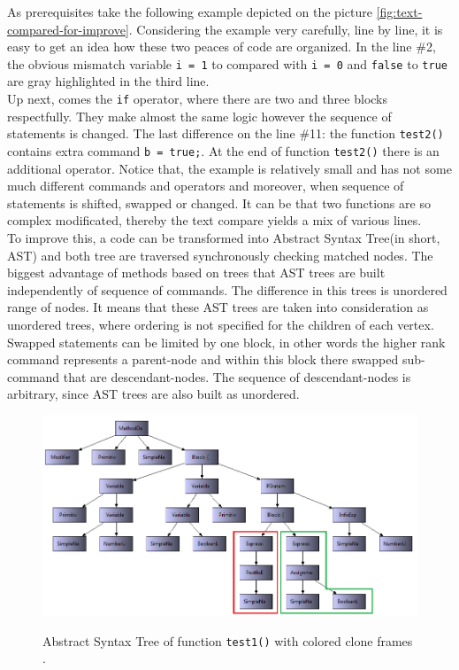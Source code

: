 \documentclass{report}
\begin{document}
As prerequisites take the following example depicted on the picture \ref{fig:text-compared-for-improve}. Considering the example very carefully, line by line, it is easy to get an idea how these two peaces of code are organized. In the line \#2, the obvious mismatch variable \texttt{i = 1} to compared with \texttt{i = 0} and \texttt{false} to \texttt{true} are gray highlighted in the third line.
\\
Up next, comes the \texttt{if} operator, where there are two and three blocks respectfully. They make almost the same logic however the sequence of statements is changed.
The last difference on the line \#11: the function \texttt{test2()} contains extra command \texttt{b = true;}.
At the end of function \texttt{test2()} there is an additional operator. Notice that, the example is relatively small and has not some much different commands and operators and moreover, when sequence of statements is shifted, swapped or changed. It can be that two functions are so complex modificated, thereby the text compare yields a mix of various lines. 
\\
To improve this, a code can be transformed into Abstract Syntax Tree(in short, AST) and both tree are traversed synchronously checking matched nodes. The biggest advantage of methods based on trees that AST trees are built independently of sequence of commands. The difference in this trees is unordered range of nodes. It means that these AST trees are taken into consideration as unordered trees, where ordering is not specified for the children of each vertex. Swapped statements can be limited by one block, in other words the higher rank command represents a parent-node and within this block there swapped sub-command that are 
descendant-nodes. The sequence of descendant-nodes is arbitrary, since AST trees are also built as unordered.\\
\begin{figure}[h]
  \centering
  \includegraphics[width=1.00\textwidth]{Figures/text-to-text/graph-compared1.png}\\[0.1cm]
  \caption[Abstract Syntax Tree of function \texttt{test1()}]{Abstract Syntax Tree of function \texttt{test1()} with colored clone frames .}
  \label{fig:graph-compared1}
\end{figure}
\end{document}
